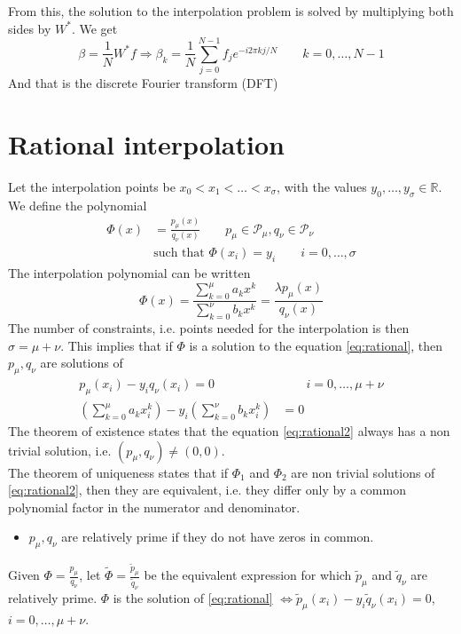 \documentclass[12pt, openany]{report}
\newcommand{\R}{\mathbb{R}}
\theoremstyle{definition}
\begin{document}
From this, the solution to the interpolation problem is solved by multiplying both sides by \(W^*\). We get 
\begin{equation}
    \beta = \frac{1}{N}W^*f \Longrightarrow \beta_k = \frac{1}{N}\sum_{j=0}^{N-1}f_j e^{-i2\pi kj/N} \qquad k=0,\dots,N-1
\end{equation}
And that is the discrete Fourier transform (DFT)
\section{Rational interpolation}
Let the interpolation points be \(x_0< x_1<\dots<x_\sigma\), with the values \(y_0,\dots,y_\sigma\in\R\). We define the polynomial
\begin{align}\label{eq:rational}
    \Phi(x) &= \frac{p_\mu(x)}{q_\nu(x)} \qquad p_\mu \in\mathcal{P}_\mu, q_\nu\in \mathcal{P}_\nu\\
    &\text{such that } \Phi(x_i)=y_i\qquad i = 0,\dots,\sigma
\end{align}
The interpolation polynomial can be written 
\begin{equation}
    \Phi(x) = \frac{\sum_{k=0}^\mu a_kx^k}{\sum_{k=0}^\nu b_kx^k} = \frac{\lambda p_\mu(x)}{q_\nu(x)}
\end{equation}
The number of constraints, i.e. points needed for the interpolation is then \(\sigma=\mu +\nu\). This implies that if \(\Phi\) is a solution to the equation \eqref{eq:rational}, then \(p_\mu,q_\nu\) are solutions of 
\begin{align}\label{eq:rational2}
    p_\mu(x_i) - y_i q_\nu(x_i) = 0&\qquad i = 0,\dots,\mu + \nu\\
    \left(\sum_{k=0}^\mu a_kx_i^k\right) - y_i\left(\sum_{k=0}^\nu b_kx_i^k\right) &= 0
\end{align}
The theorem of existence states that the equation \eqref{eq:rational2} always has a non trivial solution, i.e. \((p_\mu,q_\nu) \neq (0,0)\). \\
The theorem of uniqueness states that if \(\Phi_1\) and \(\Phi_2\) are non trivial solutions of \eqref{eq:rational2}, then they are equivalent, i.e. they differ only by a common polynomial factor in the numerator and denominator.\\

\begin{itemize}
    \item \(p_\mu,q_\nu\) are relatively prime if they do not have zeros in common.
\end{itemize}
Given \(\Phi = \frac{p_\mu}{q_\nu}\), let \(\tilde{\Phi}=\frac{\tilde{p}_\mu}{\tilde{q}_\nu}\) be the equivalent expression for which \(\tilde{p}_\mu\) and \(\tilde{q}_\nu\) are relatively prime. \(\Phi\) is the solution of \eqref{eq:rational} \(\Longleftrightarrow \tilde{p}_\mu(x_i)-y_i \tilde{q}_\nu(x_i)=  0\), \(i=0,\dots,\mu+\nu\).  
\end{document}
